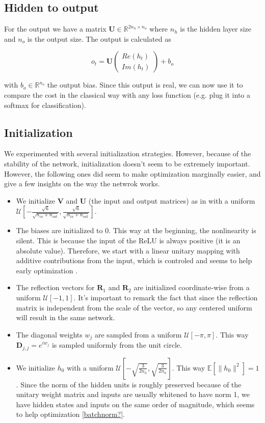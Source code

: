 \documentclass{article} %
\newcommand{\matr}[1]{\mathbf{#1}}
\newcommand\RR{\mathbb{R}}
\begin{document}
\subsection{Hidden to output}

For the output we have a matrix $\matr{U} \in \RR^{2n_h \times n_o}$ where $n_h$ is the hidden layer size and $n_o$ is the output size. The output is calculated as

$$ o_t = \matr{U} \begin{pmatrix} Re(h_t) \\ Im(h_t) \end{pmatrix} + b_o $$

with $b_o \in \RR^{n_o}$ the output bias. Since this output is real, we can now use it to compare the cost in the classical way with any loss function (e.g. plug it into a softmax for classification).
\subsection{Initialization}

We experimented with several initialization strategies. However, because of the stability of the network, initialization doesn't seem to be extremely important. However, the following ones did seem to make optimization marginally easier, and give a few insights on the way the netwrok works.

\begin{itemize}
  \item We initialize $\matr{V}$ and $\matr{U}$ (the input and output matrices) as in \cite{Glorotinit} with a uniform $\mathcal{U}\left[-\frac{\sqrt{6}}{\sqrt{n_{in}+ n_{out}}}, \frac{\sqrt{6}}{\sqrt{n_{in}+ n_{out}}}\right]$.
  \item The biases are initialized to 0. This way at the beginning, the nonlinearity is silent. This is because the input of the ReLU is always positive (it is an absolute value). Therefore, we start with a linear unitary mapping with additive contributions from the input, which is controled and seems to help early optimization \citep{Quoc2015}.
  \item The reflection vectors for $\matr{R}_1$ and $\matr{R}_2$ are initialized coordinate-wise from a uniform $\mathcal{U}[-1, 1]$. It's important to remark the fact that since the reflection matrix is independent from the scale of the vector, so any centered uniform will result in the same network.
  \item The diagonal weights $w_j$ are sampled from a uniform $\mathcal{U}[-\pi, \pi]$. This way $\matr{D}_{j,j} = e^{i w_j}$ is sampled uniformly from the unit circle.
  \item We initialize $h_0$ with a uniform $\mathcal{U}\left[-\sqrt{\frac{3}{2n_h}}, \sqrt{\frac{3}{2n_h}} \right]$. This way $\mathbb{E}\left[\|h_0\|^2\right] = 1$. Since the norm of the hidden units is roughly preserved because of the unitary weight matrix and inputs are usually whitened to have norm 1, we have hidden states and inputs on the same order of magnitude, which seems to help optimization \ref{batchnorm?}.
\end{itemize}



\end{document}

